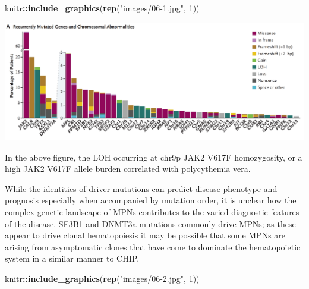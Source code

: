 \documentclass[]{book}
\newenvironment{Shaded}{\begin{snugshade}}{\end{snugshade}}
\newcommand{\KeywordTok}[1]{\textcolor[rgb]{0.13,0.29,0.53}{\textbf{#1}}}
\newcommand{\DataTypeTok}[1]{\textcolor[rgb]{0.13,0.29,0.53}{#1}}
\newcommand{\DecValTok}[1]{\textcolor[rgb]{0.00,0.00,0.81}{#1}}
\newcommand{\StringTok}[1]{\textcolor[rgb]{0.31,0.60,0.02}{#1}}
\newcommand{\OtherTok}[1]{\textcolor[rgb]{0.56,0.35,0.01}{#1}}
\newcommand{\OperatorTok}[1]{\textcolor[rgb]{0.81,0.36,0.00}{\textbf{#1}}}
\newcommand{\NormalTok}[1]{#1}
\begin{document}
\begin{Shaded}
\begin{Highlighting}[]
\NormalTok{knitr}\OperatorTok{::}\KeywordTok{include_graphics}\NormalTok{(}\KeywordTok{rep}\NormalTok{(}\StringTok{"images/06-1.jpg"}\NormalTok{, }\DecValTok{1}\NormalTok{))          }
\end{Highlighting}
\end{Shaded}

\includegraphics{images/06-1.jpg}

\begin{Shaded}
\end{Shaded}

\citep{grinfeld2018classification}

In the above figure, the LOH occurring at chr9p JAK2 V617F homozygosity,
or a high JAK2 V617F allele burden correlated with polycythemia vera.

While the identities of driver mutations can predict disease phenotype
and prognosis
\citep{vannucchi2013mutations, tefferi2016targeted, yogarajah2017leukemic}
especially when accompanied by mutation order, it is unclear how the
complex genetic landscape of MPNs contributes to the varied diagnostic
features of the disease. SF3B1 and DNMT3a mutations commonly drive MPNs;
as these appear to drive clonal hematopoiesis it may be possible that
some MPNs are arising from asymptomatic clones that have come to
dominate the hematopoietic system in a similar manner to CHIP.

\begin{Shaded}
\begin{Highlighting}[]
\NormalTok{knitr}\OperatorTok{::}\KeywordTok{include_graphics}\NormalTok{(}\KeywordTok{rep}\NormalTok{(}\StringTok{"images/06-2.jpg"}\NormalTok{, }\DecValTok{1}\NormalTok{))          }
\end{Highlighting}
\end{Shaded}
\end{document}
